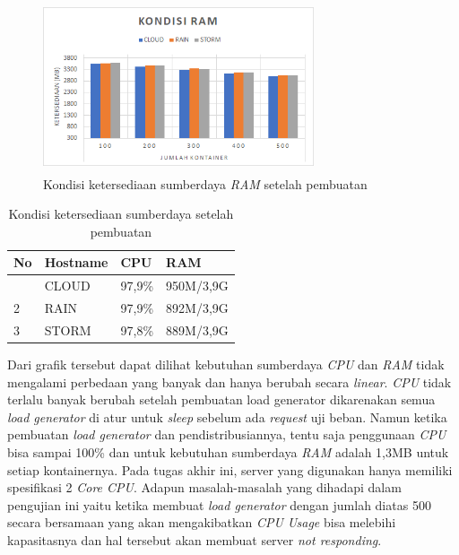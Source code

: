 				\begin{figure}[H]
					\centering
					\includegraphics[width=8cm,height=5cm]{Images/C-5/pembuatanram.png}
					\caption{Kondisi ketersediaan sumberdaya \textit{RAM} setelah pembuatan}
					\label{pembuatanram}
				\end{figure}
			
				\begin{longtable}{|p{}|p{}|p{}|p{}|}
					\caption{Kondisi ketersediaan sumberdaya setelah pembuatan} \label{suberdayasetpembuatan} \\
					\hline
					\textbf{No} & \textbf{Hostname} & \textbf{CPU} & \textbf{RAM} \\ \hline
					\endhead
					\endfoot
					\endlastfoot
					1 & CLOUD & 97,9\% & 950M/3,9G \\ \hline
					2 & RAIN & 97,9\% & 892M/3,9G \\ \hline
					3 & STORM & 97,8\% & 889M/3,9G \\ \hline
				\end{longtable}
				
				Dari grafik tersebut dapat dilihat kebutuhan sumberdaya \textit{CPU} dan \textit{RAM} tidak mengalami perbedaan yang banyak dan hanya berubah secara \textit{linear}. \textit{CPU} tidak terlalu banyak berubah setelah pembuatan load generator dikarenakan semua \textit{load generator} di atur untuk \textit{sleep} sebelum ada \textit{request} uji beban. Namun ketika pembuatan \textit{load generator} dan pendistribusiannya, tentu saja penggunaan \textit{CPU} bisa sampai 100\% dan untuk kebutuhan sumberdaya \textit{RAM} adalah 1,3MB untuk setiap kontainernya. Pada tugas akhir ini, server yang digunakan hanya memiliki spesifikasi 2 \textit{Core CPU}. Adapun masalah-masalah yang dihadapi dalam pengujian ini yaitu ketika membuat \textit{load generator} dengan jumlah diatas 500 secara bersamaan yang akan mengakibatkan \textit{CPU Usage} bisa melebihi kapasitasnya dan hal tersebut akan membuat server \textit{not responding}.
				
